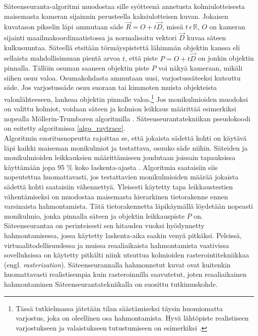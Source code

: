 \documentclass[a4paper, 12pt, titlepage]{article}
\newcommand{\R}{\mathbb{R}}
\begin{document}
Säteenseuranta-algoritmi muodostaa sille syötteenä annetusta kolmiulotteisesta maisemasta kameran sijainnin perusteella kaksiulotteisen kuvan. Jokaisen kuvatason pikselin läpi ammutaan säde $\vec{R}=O+t\vec{D}$, missä $t\,\epsilon\,\R$, $O$ on kameran sijainti maailmakoordinaatistossa ja normalisoitu vektori $\vec{D}$ kuvaa säteen kulkusuuntaa. Säteellä etsitään törmäyspistettä lähimmän objektin kanssa eli sellaista mahdollisimman pientä arvoa $t$, että piste $P=O+t\vec{D}$ on jonkin objektin pinnalla. Tällöin osuman saaneen objektin piste $P$ voi näkyä kameraan, mikäli siihen osuu valoa. Osumakohdasta ammutaan uusi, varjostussäteeksi kutsuttu säde. Jos varjostussäde osuu suoraan tai kimmoten muista objekteista valonlähteeseen, lankeaa objektin pinnalle valoa.\footnote{Tässä tutkielmassa jätetään tilan säästämiseksi täysin huomiomatta varjostus, joka on oleellinen osa hahmontamista. Hyvä lähtöpiste realistiseen varjostukseen ja valaistukseen tutustumiseen on esimerkiksi \citep{kajiya}.}  \citep[.]{janke} Jos monikulmioiden muodoksi on valittu kolmiot, voidaan säteen ja kolmion leikkaus määrittää esimerkiksi nopealla Möllerin-Trumboren algoritmilla \citep[ks.][]{moller}. Säteenseurantatekniikan pseudokoodi on esitetty algoritmissa \ref{algo_raytrace}.\\


Algoritmin suoritusnopeutta rajoittaa se, että jokaista sädettä kohti on käytävä läpi kaikki maiseman monikulmiot ja testattava, osuuko säde niihin. Säteiden ja monikulmioiden leikkauksien määrittämiseen joudutaan joissain tapauksissa käyttämään jopa 95 \% koko laskenta-ajasta \citep{whitted}. Algoritmia saataisiin siis nopeutettua huomattavasti, jos testattavien monikulmioiden määrää jokaista sädettä kohti saataisiin vähennettyä. Yleisesti käytetty tapa leikkaustestien vähentämiseksi on muodostaa maisemasta hierarkinen tietorakenne ennen varsinaista hahmontamista. Tätä tietorakennetta läpikäymällä löydetään nopeasti monikulmio, jonka pinnalla säteen ja objektin leikkauspiste $P$ on. \citep[.]{rubin}\\

Säteenseurantaa on perinteisesti sen hitauden vuoksi hyödynnetty hahmontamisessa, jossa käytetty laskenta-aika saakin venyä pitkäksi. Peleissä, virtuaalitodellisuudessa ja muissa reaaliaikaista hahmontamista vaativissa sovelluksissa on käytetty pitkälti niink utsuttua kolmioiden rasterointitekniikkaa (engl. \emph{rasterization}). Säteenseurannalla hahmonnetut kuvat ovat kuitenkin huomattavasti realistisempia kuin rasteroinnilla saavutetut, joten reaaliaikainen hahmontaminen Säteenseurantatekniikalla on suosittu tutkimuskohde. \citep[.]{wald04}  
 
\end{document}
